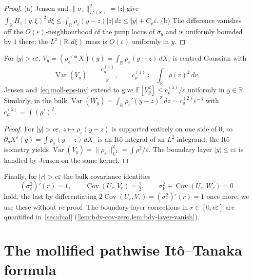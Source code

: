 \documentclass[EJP]{ejpecp}
\newcommand{\R}{\mathbb{R}}
\renewcommand{\E}{\mathbb{E}}
\DeclareMathOperator{\Var}{Var}
\DeclareMathOperator{\Cov}{Cov}
\begin{document}
\begin{proof}
(a) Jensen and $\|\sigma_z\|_{L^{2}(\R)}^{2}=|z|$ give
$\int_\R H_\varepsilon(y,\xi)^{2}\,d\xi\le
\int_\R\rho_\varepsilon(y-z)|z|\,dz\le|y|+C_\rho\varepsilon$.
(b) The difference vanishes off the $O(\varepsilon)$-neighbourhood of
the jump locus of $\sigma_y$ and is uniformly bounded by $1$ there;
the $L^{2}(\R,d\xi)$ mass is $O(\varepsilon)$ uniformly in $y$.
\end{proof}

\begin{lemma}
\label{lem:moll-eps-inv}
For $|y|>c\varepsilon$,
$V_y=(\rho_\varepsilon'*X)(y)=\int_\R\rho_\varepsilon(y-z)\,dX_z$
is centred Gaussian with
\begin{equation}\label{eq:moll-eps-inv}
  \Var(V_y)\;=\;\frac{c_\rho^{(1)}}{\varepsilon},
  \qquad c_\rho^{(1)}\coloneqq\int_\R\rho(v)^{2}\,dv.
\end{equation}
Jensen and~\eqref{eq:moll-eps-inv} extend to give
$\E[V_y^{2}]\le c_\rho^{(1)}/\varepsilon$ uniformly in $y\in\R$.
Similarly, in the bulk
$\Var(W_y)=\int_\R\rho_\varepsilon'(y-z)^{2}\,dz=c_\rho^{(2)}\varepsilon^{-3}$
with $c_\rho^{(2)}=\int(\rho')^{2}$.
\end{lemma}

\begin{proof}
For $|y|>c\varepsilon$, $z\mapsto\rho_\varepsilon(y-z)$ is supported
entirely on one side of $0$, so $\partial_y X^\varepsilon(y)=
\int\rho_\varepsilon(y-z)\,dX_z$ is an It\^o integral of an
$L^{2}$ integrand; the It\^o isometry yields
$\Var(V_y)=\|\rho_\varepsilon\|_{L^{2}}^{2}=\int\rho^{2}/\varepsilon$.
The boundary layer $|y|\le c\varepsilon$ is handled by Jensen on
the same kernel.
\end{proof}

Finally, for $|r|>c\varepsilon$ the bulk covariance identities
\begin{equation}\label{eq:bulk-cov}
  (\sigma_\varepsilon^{2})'(r)=1,\qquad
  \Cov(U_r,V_r)=\tfrac12,\qquad
  \sigma_V^{2}+\Cov(U_r,W_r)=0
\end{equation}
hold, the last by differentiating $2\Cov(U_r,V_r)=
(\sigma_\varepsilon^{2})'(r)=1$ once more; we use these without
re-proof. The boundary-layer corrections in $r\in[0,c\varepsilon]$
are quantified in~\cref{sec:dual} (\cref{lem:bdy-cov-zero,lem:bdy-layer-vanish}).

\section{The mollified pathwise It\^o--Tanaka formula}\label{sec:moll-ito}
\end{document}
